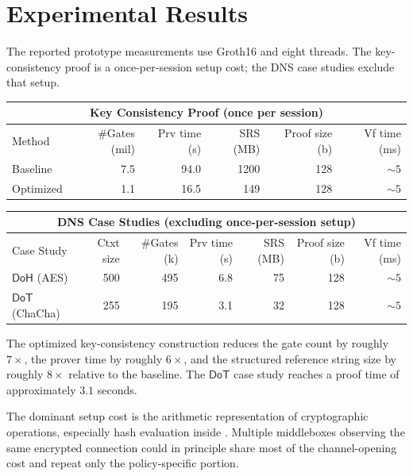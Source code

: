 \documentclass[11pt]{article}
\newcommand{\DoH}{\ensuremath{\mathsf{DoH}}}
\newcommand{\DoT}{\ensuremath{\mathsf{DoT}}}
\begin{document}
\section{Experimental Results}

The reported prototype measurements use Groth16 and eight threads.  The
key-consistency proof is a once-per-session setup cost; the DNS case studies
exclude that setup.

\begin{center}
\small
\renewcommand{\arraystretch}{1.1}
\setlength{\tabcolsep}{5pt}
\begin{tabular}{lrrrrr}
\multicolumn{6}{c}{Key Consistency Proof (once per session)}\\[0.3em]
\hline
Method & \#Gates (mil) & Prv time (s) & SRS (MB) & Proof size (b) & Vf time (ms) \\
\hline
Baseline  & 7.5 & 94.0 & 1200 & 128 & $\sim 5$ \\
Optimized & 1.1 & 16.5 & 149  & 128 & $\sim 5$ \\
\hline
\end{tabular}
\end{center}

\begin{center}
\small
\renewcommand{\arraystretch}{1.1}
\setlength{\tabcolsep}{4pt}
\begin{tabular}{lrrrrrr}
\multicolumn{7}{c}{DNS Case Studies (excluding once-per-session setup)}\\[0.3em]
\hline
Case Study & Ctxt size & \#Gates (k) & Prv time (s) & SRS (MB) & Proof size (b) & Vf time (ms) \\
\hline
\DoH{} (AES)    & 500 & 495 & 6.8 & 75 & 128 & $\sim 5$ \\
\DoT{} (ChaCha) & 255 & 195 & 3.1 & 32 & 128 & $\sim 5$ \\
\hline
\end{tabular}
\end{center}

The optimized key-consistency construction reduces the gate count by roughly
$7\times$, the prover time by roughly $6\times$, and the structured reference
string size by roughly $8\times$ relative to the baseline.  The \DoT{} case
study reaches a proof time of approximately $3.1$ seconds.

\begin{remark}
The dominant setup cost is the arithmetic representation of cryptographic
operations, especially hash evaluation inside .  Multiple
middleboxes observing the same encrypted connection could in principle share
most of the channel-opening cost and repeat only the policy-specific portion.
\end{remark}
\end{document}
